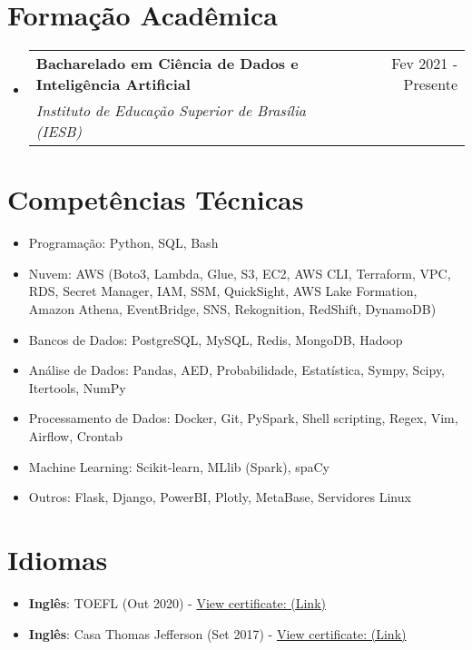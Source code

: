 \documentclass[letterpaper,11pt]{article}%
\makeatletter
\newcommand{\resumeSubheading}[4]{\vspace{-1pt}\item\begin{tabular*}{0.97\textwidth}[t]{l@{\extracolsep{\fill}}r}\textbf{#1} & #2 \\\textit{\small #3} & \textit{\small #4} \\\end{tabular*}\vspace{-8pt}}%
\newcommand{\resumeSubHeadingListStart}{\begin{itemize}[leftmargin=0.15in, label={}, itemsep=0pt, parsep=0pt]}%
\newcommand{\resumeSubHeadingListEnd}{\end{itemize}}%
\newcommand{\resumeItemListStart}{\begin{itemize}[itemsep=0pt, parsep=0pt]}%
\newcommand{\resumeItemListEnd}{\end{itemize}\vspace{-1pt}}%
\makeatother
\begin{document}
%
\section*{Formação Acadêmica}%
\label{sec:FormaoAcadmica}%
\resumeSubHeadingListStart%
\resumeSubheading{Bacharelado em Ciência de Dados e Inteligência Artificial}{Fev 2021 - Presente}{Instituto de Educação Superior de Brasília (IESB)}{}%
\resumeSubHeadingListEnd

%
\section*{Competências Técnicas}%
\label{sec:CompetnciasTcnicas}%
\begin{multicols}{2}%
\resumeItemListStart%
\item Programação: Python, SQL, Bash%
\item Nuvem: AWS (Boto3, Lambda, Glue, S3, EC2, AWS CLI, Terraform, VPC, RDS, Secret Manager, IAM, SSM, QuickSight, AWS Lake Formation, Amazon Athena, EventBridge, SNS, Rekognition, RedShift, DynamoDB)%
\item Bancos de Dados: PostgreSQL, MySQL, Redis, MongoDB, Hadoop%
\item Análise de Dados: Pandas, AED, Probabilidade, Estatística, Sympy, Scipy, Itertools, NumPy%
\item Processamento de Dados: Docker, Git, PySpark, Shell scripting, Regex, Vim, Airflow, Crontab%
\item Machine Learning: Scikit-learn, MLlib (Spark), spaCy%
\item Outros: Flask, Django, PowerBI, Plotly, MetaBase, Servidores Linux%
\resumeItemListEnd%
\end{multicols}

%
\section*{Idiomas}%
\label{sec:Idiomas}%
\begin{itemize}[leftmargin=0.15in, label={}]%
\item%
\textbf{Inglês}: TOEFL (Out 2020) - \href{https://github.com/s33ding/my_resume/blob/main/my_certificates/english_TOEFL_my_score.pdf}{View certificate: (Link)}%
\item%
\textbf{Inglês}: Casa Thomas Jefferson (Set 2017) - \href{https://github.com/s33ding/my_resume/blob/main/my_certificates/english_Casa%20Thomas%20Jefferson.pdf}{View certificate: (Link)}%
\end{itemize}

%
\end{document}
